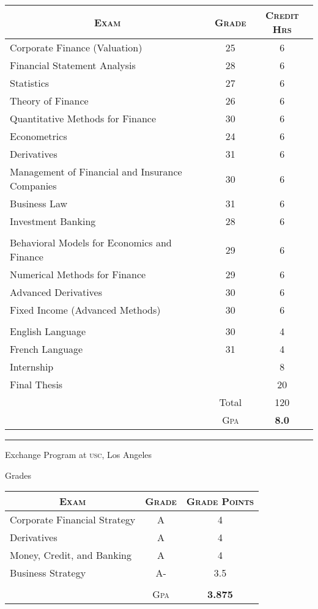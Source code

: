 \documentclass[a4paper,10pt]{article} %
\begin{document}
\begin{center}
\begin{tabular}{lcc}

\multicolumn{1}{c}{\textsc{Exam}} & \textsc{Grade}&\textsc{Credit Hrs}\\ \hline
Corporate Finance (Valuation) & 25 & 6\\
Financial Statement Analysis & 28 & 6\\
Statistics & 27 & 6\\
Theory of Finance & 26 & 6\\
Quantitative Methods for Finance & 30 & 6\\
Econometrics & 24 & 6\\
Derivatives & 31 & 6\\
Management of Financial and Insurance Companies & 30 & 6\\
Business Law & 31 & 6\\
Investment Banking	& 28 & 6\\ \\
Behavioral Models for Economics and Finance	 & 29 & 6\\
Numerical Methods for Finance & 29 & 6\\
Advanced Derivatives & 30 & 6\\
Fixed Income (Advanced Methods) & 30 & 6\\ \\
English Language & 30 &	4\\
French Language & 31 &	4\\
Internship & & 8\\
Final Thesis & & 20\\
& Total & 120\\\cline{2-3}
&\textsc{Gpa}&\textbf{8.0}

\end{tabular}
\end{center}
\bigskip
\hrule
\bigskip
\bigskip

\par{\centering\Large \hypertarget{grds_usc}{Exchange Program at \textsc{usc}, Los Angeles}\par}\large{\centering Grades\par}\normalsize

\begin{center}
\begin{tabular}{lcc}

\multicolumn{1}{c}{\textsc{Exam}} & \textsc{Grade} & \textsc{Grade Points}\\
\hline
Corporate Financial Strategy & A & 4\\
Derivatives & A & 4\\
Money, Credit, and Banking & A & 4\\
Business Strategy & A- & 3.5\\
& &\\\cline{2-3}
& \textsc{Gpa} & \textbf{3.875}

\end{tabular}
\end{center}
\end{document}
